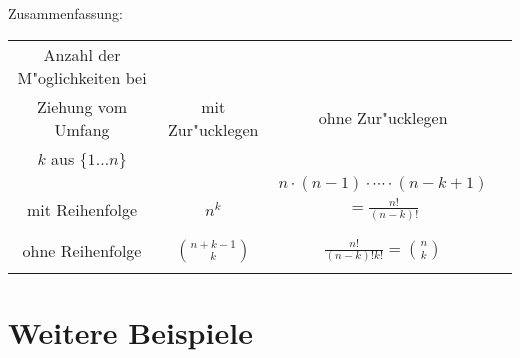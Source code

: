 \documentclass[a4paper,11pt]{book}
\theoremstyle{nonumberplain}
\begin{document}
	Zusammenfassung:\\
	\begin{tabular}[t]{|c|c|c|c} 
	\hline
 Anzahl der M"oglichkeiten bei &  & \\
 Ziehung vom Umfang & mit Zur"ucklegen & ohne Zur"ucklegen \\
 $k$ aus $\{1\ldots n\}$     &          &   	\\ \hline
                    &          &  $n\cdot (n-1)\cdot\cdots\cdot (n-k+1)$    \\
 mit Reihenfolge    & $n^{k}$ & $=\frac{n!}{(n-k)!}$        	\\ 
				    &          &  		\\ \hline
                    &          &        \\
 ohne Reihenfolge   &  $n+k-1 \choose k$ &  $\frac{n!}{(n-k)!k!} ={n\choose k}$     	\\ 
				    &          &  		\\ \hline
						 
\end{tabular}

\section{Weitere Beispiele}
\end{document}
